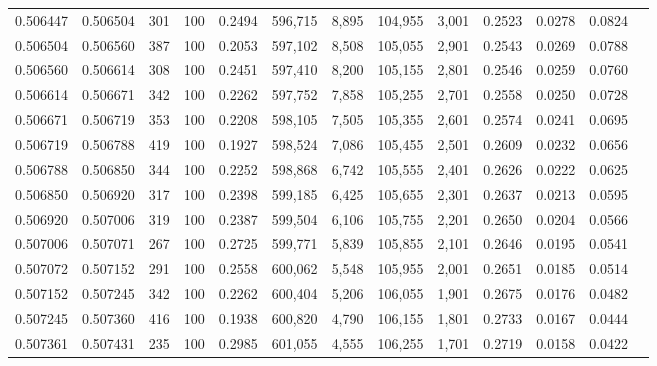\begin{tabular}{rrrrrrrrrrrrr}
0.506447 & 0.506504 &   301 & 100 &                                     0.2494 & 596,715 &   8,895 & 104,955 &   3,001 & 0.2523 & 0.0278 & 0.0824 \\
0.506504 & 0.506560 &   387 & 100 &                                     0.2053 & 597,102 &   8,508 & 105,055 &   2,901 & 0.2543 & 0.0269 & 0.0788 \\
0.506560 & 0.506614 &   308 & 100 &                                     0.2451 & 597,410 &   8,200 & 105,155 &   2,801 & 0.2546 & 0.0259 & 0.0760 \\
0.506614 & 0.506671 &   342 & 100 &                                     0.2262 & 597,752 &   7,858 & 105,255 &   2,701 & 0.2558 & 0.0250 & 0.0728 \\
0.506671 & 0.506719 &   353 & 100 &                                     0.2208 & 598,105 &   7,505 & 105,355 &   2,601 & 0.2574 & 0.0241 & 0.0695 \\
0.506719 & 0.506788 &   419 & 100 &                                     0.1927 & 598,524 &   7,086 & 105,455 &   2,501 & 0.2609 & 0.0232 & 0.0656 \\
0.506788 & 0.506850 &   344 & 100 &                                     0.2252 & 598,868 &   6,742 & 105,555 &   2,401 & 0.2626 & 0.0222 & 0.0625 \\
0.506850 & 0.506920 &   317 & 100 &                                     0.2398 & 599,185 &   6,425 & 105,655 &   2,301 & 0.2637 & 0.0213 & 0.0595 \\
0.506920 & 0.507006 &   319 & 100 &                                     0.2387 & 599,504 &   6,106 & 105,755 &   2,201 & 0.2650 & 0.0204 & 0.0566 \\
0.507006 & 0.507071 &   267 & 100 &                                     0.2725 & 599,771 &   5,839 & 105,855 &   2,101 & 0.2646 & 0.0195 & 0.0541 \\
0.507072 & 0.507152 &   291 & 100 &                                     0.2558 & 600,062 &   5,548 & 105,955 &   2,001 & 0.2651 & 0.0185 & 0.0514 \\
0.507152 & 0.507245 &   342 & 100 &                                     0.2262 & 600,404 &   5,206 & 106,055 &   1,901 & 0.2675 & 0.0176 & 0.0482 \\
0.507245 & 0.507360 &   416 & 100 &                                     0.1938 & 600,820 &   4,790 & 106,155 &   1,801 & 0.2733 & 0.0167 & 0.0444 \\
0.507361 & 0.507431 &   235 & 100 &                                     0.2985 & 601,055 &   4,555 & 106,255 &   1,701 & 0.2719 & 0.0158 & 0.0422 \\

\end{tabular}
